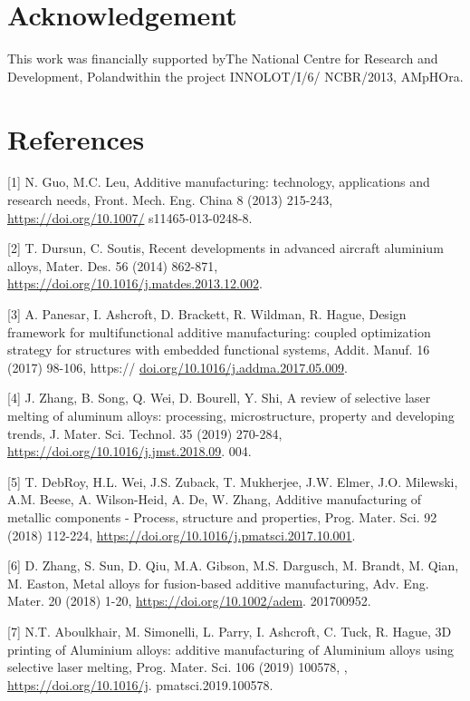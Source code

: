 \documentclass[10pt]{article}
\begin{document}
\section*{Acknowledgement}
This work was financially supported byThe National Centre for Research and Development, Polandwithin the project INNOLOT/I/6/ NCBR/2013, AMpHOra.

\section*{References}
[1] N. Guo, M.C. Leu, Additive manufacturing: technology, applications and research needs, Front. Mech. Eng. China 8 (2013) 215-243, \href{https://doi.org/10.1007/}{https://doi.org/10.1007/} s11465-013-0248-8.

[2] T. Dursun, C. Soutis, Recent developments in advanced aircraft aluminium alloys, Mater. Des. 56 (2014) 862-871, \href{https://doi.org/10.1016/j.matdes.2013.12.002}{https://doi.org/10.1016/j.matdes.2013.12.002}.

[3] A. Panesar, I. Ashcroft, D. Brackett, R. Wildman, R. Hague, Design framework for multifunctional additive manufacturing: coupled optimization strategy for structures with embedded functional systems, Addit. Manuf. 16 (2017) 98-106, https:// \href{http://doi.org/10.1016/j.addma.2017.05.009}{doi.org/10.1016/j.addma.2017.05.009}.

[4] J. Zhang, B. Song, Q. Wei, D. Bourell, Y. Shi, A review of selective laser melting of aluminum alloys: processing, microstructure, property and developing trends, J. Mater. Sci. Technol. 35 (2019) 270-284, \href{https://doi.org/10.1016/j.jmst.2018.09}{https://doi.org/10.1016/j.jmst.2018.09}. 004.

[5] T. DebRoy, H.L. Wei, J.S. Zuback, T. Mukherjee, J.W. Elmer, J.O. Milewski, A.M. Beese, A. Wilson-Heid, A. De, W. Zhang, Additive manufacturing of metallic components - Process, structure and properties, Prog. Mater. Sci. 92 (2018) 112-224, \href{https://doi.org/10.1016/j.pmatsci.2017.10.001}{https://doi.org/10.1016/j.pmatsci.2017.10.001}.

[6] D. Zhang, S. Sun, D. Qiu, M.A. Gibson, M.S. Dargusch, M. Brandt, M. Qian, M. Easton, Metal alloys for fusion-based additive manufacturing, Adv. Eng. Mater. 20 (2018) 1-20, \href{https://doi.org/10.1002/adem}{https://doi.org/10.1002/adem}. 201700952.

[7] N.T. Aboulkhair, M. Simonelli, L. Parry, I. Ashcroft, C. Tuck, R. Hague, 3D printing of Aluminium alloys: additive manufacturing of Aluminium alloys using selective laser melting, Prog. Mater. Sci. 106 (2019) 100578, , \href{https://doi.org/10.1016/j}{https://doi.org/10.1016/j}. pmatsci.2019.100578.
\end{document}
